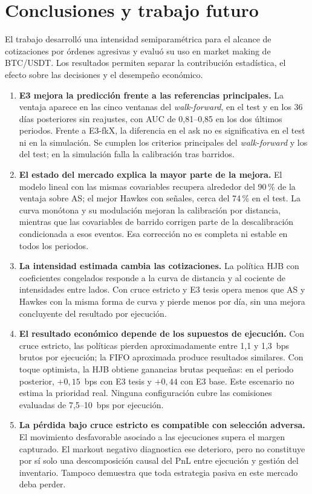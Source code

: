 \chapter{Conclusiones y trabajo futuro}
\label{chap:conclusiones}

El trabajo desarrolló una intensidad semiparamétrica para el alcance de cotizaciones por órdenes agresivas y evaluó su uso en market making de BTC/USDT. Los resultados permiten separar la contribución estadística, el efecto sobre las decisiones y el desempeño económico.

\begin{enumerate}
\item \textbf{E3 mejora la predicción frente a las referencias principales.} La ventaja aparece en las cinco ventanas del \textit{walk-forward}, en el test y en los 36 días posteriores sin reajustes, con AUC de 0,81--0,85 en los dos últimos periodos. Frente a E3-fkX, la diferencia en el ask no es significativa en el test ni en la simulación. Se cumplen los criterios principales del \textit{walk-forward} y los del test; en la simulación falla la calibración tras barridos.
\item \textbf{El estado del mercado explica la mayor parte de la mejora.} El modelo lineal con las mismas covariables recupera alrededor del 90\,\% de la ventaja sobre AS; el mejor Hawkes con señales, cerca del 74\,\% en el test. La curva monótona y su modulación mejoran la calibración por distancia, mientras que las covariables de barrido corrigen parte de la descalibración condicionada a esos eventos. Esa corrección no es completa ni estable en todos los periodos.
\item \textbf{La intensidad estimada cambia las cotizaciones.} La política HJB con coeficientes congelados responde a la curva de distancia y al cociente de intensidades entre lados. Con cruce estricto y E3 tesis opera menos que AS y Hawkes con la misma forma de curva y pierde menos por día, sin una mejora concluyente del resultado por ejecución.
\item \textbf{El resultado económico depende de los supuestos de ejecución.} Con cruce estricto, las políticas pierden aproximadamente entre 1,1 y 1,3~bps brutos por ejecución; la FIFO aproximada produce resultados similares. Con toque optimista, la HJB obtiene ganancias brutas pequeñas: en el periodo posterior, $+0{,}15$~bps con E3 tesis y $+0{,}44$ con E3 base. Este escenario no estima la prioridad real. Ninguna configuración cubre las comisiones evaluadas de 7,5--10~bps por ejecución.
\item \textbf{La pérdida bajo cruce estricto es compatible con selección adversa.} El movimiento desfavorable asociado a las ejecuciones supera el margen capturado. El markout negativo diagnostica ese deterioro, pero no constituye por sí solo una descomposición causal del PnL entre ejecución y gestión del inventario. Tampoco demuestra que toda estrategia pasiva en este mercado deba perder.
\end{enumerate}

